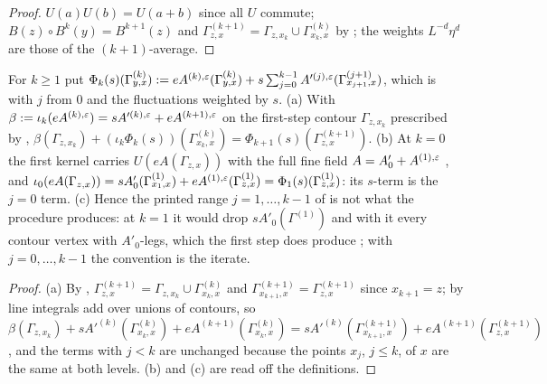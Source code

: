 \begin{proof}
$U(a)U(b)=U(a+b)$ since all $U$ commute; $B(z)\circ B^k(y)=B^{k+1}(z)$ and $\Gamma^{(k+1)}_{z,x}=\Gamma_{z,x_k}\cup\Gamma^{(k)}_{x_k,x}$ by \cite[(2.2)]{Ba1}; the weights $L^{-d}\eta^d$ are those of the $(k+1)$-average.
\end{proof}

\begin{lemma}\label{lem:a06d:B5}
For $k\ge1$ put $\Phi_k(s)(\Gamma^{(k)}_{y,x}):= eA^{(k),\varepsilon}(\Gamma^{(k)}_{y,x})+s\sum_{j=0}^{k-1}A'^{(j),\varepsilon}(\Gamma^{(j+1)}_{x_{j+1},x})$, which is \cite[(3.34)]{Ba1} with $j$ from $0$ and the fluctuations weighted by $s$. \textup{(a)} With $\beta:=\iota_k(eA^{(k),\varepsilon})=sA'^{(k),\varepsilon}+eA^{(k+1),\varepsilon}$ on the first-step contour $\Gamma_{z,x_k}$ prescribed by \cite[(3.37)]{Ba1}, $\beta(\Gamma_{z,x_k})+(\iota_k\Phi_k(s))(\Gamma^{(k)}_{x_k,x})=\Phi_{k+1}(s)(\Gamma^{(k+1)}_{z,x})$. \textup{(b)} At $k=0$ the first kernel carries $U(eA(\Gamma_{z,x}))$ with the full fine field $A=A'_0+A^{(1),\varepsilon}$ \cite[(3.15), p.~615]{Ba1}, and $\iota_0(eA(\Gamma_{z,x}))=sA'_0(\Gamma^{(1)}_{x_1,x})+eA^{(1),\varepsilon}(\Gamma^{(1)}_{z,x})=\Phi_1(s)(\Gamma^{(1)}_{z,x})$: its $s$-term is the $j=0$ term. \textup{(c)} Hence the printed range $j=1,\dots,k-1$ of \cite[(3.34)]{Ba1} is not what the procedure produces: at $k=1$ it would drop $sA'_0(\Gamma^{(1)})$ and with it every contour vertex \cite[(1.14)]{Ba3} with $A'_0$-legs, which the first step does produce \cite[(3.15)--(3.16)]{Ba1}; with $j=0,\dots,k-1$ the convention is the iterate.
\end{lemma}

\begin{proof}
(a) By \cite[(2.2)]{Ba1}, $\Gamma^{(k+1)}_{z,x}=\Gamma_{z,x_k}\cup\Gamma^{(k)}_{x_k,x}$ and $\Gamma^{(k+1)}_{x_{k+1},x}=\Gamma^{(k+1)}_{z,x}$ since $x_{k+1}=z$; by \cite[(2.3)]{Ba1} line integrals add over unions of contours, so $\beta(\Gamma_{z,x_k})+sA'^{(k)}(\Gamma^{(k)}_{x_k,x})+eA^{(k+1)}(\Gamma^{(k)}_{x_k,x})=sA'^{(k)}(\Gamma^{(k+1)}_{x_{k+1},x})+eA^{(k+1)}(\Gamma^{(k+1)}_{z,x})$, and the terms with $j<k$ are unchanged because the points $x_j$, $j\le k$, of $x$ are the same at both levels. (b) and (c) are read off the definitions.
\end{proof}

